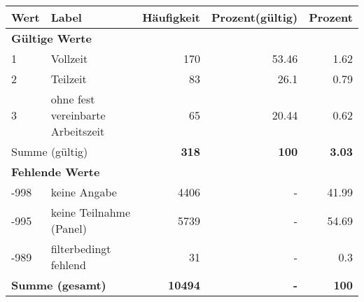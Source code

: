      \begin{longtable}{lXrrr}
     \toprule
     \textbf{Wert} & \textbf{Label} & \textbf{Häufigkeit} & \textbf{Prozent(gültig)} & \textbf{Prozent} \\
     \endhead
     \midrule
     \multicolumn{5}{l}{\textbf{Gültige Werte}}\\

     1 &
     \multicolumn{1}{X}{ Vollzeit   } &


       \num{170} &
       \num[round-mode=places,round-precision=2]{53.46} &
         \num[round-mode=places,round-precision=2]{1.62} \\

     2 &
     \multicolumn{1}{X}{ Teilzeit   } &


       \num{83} &
       \num[round-mode=places,round-precision=2]{26.1} &
         \num[round-mode=places,round-precision=2]{0.79} \\

     3 &
     \multicolumn{1}{X}{ ohne fest vereinbarte Arbeitszeit   } &


       \num{65} &
       \num[round-mode=places,round-precision=2]{20.44} &
         \num[round-mode=places,round-precision=2]{0.62} \\
     \midrule
     \multicolumn{2}{l}{Summe (gültig)} &
       \textbf{\num{318}} &
     \textbf{\num{100}} &
       \textbf{\num[round-mode=places,round-precision=2]{3.03}} \\
     \multicolumn{5}{l}{\textbf{Fehlende Werte}}\\
       -998 &
       keine Angabe &
         \num{4406} &
        - &
         \num[round-mode=places,round-precision=2]{41.99} \\
       -995 &
       keine Teilnahme (Panel) &
         \num{5739} &
        - &
         \num[round-mode=places,round-precision=2]{54.69} \\
       -989 &
       filterbedingt fehlend &
         \num{31} &
        - &
         \num[round-mode=places,round-precision=2]{0.3} \\
     \midrule
     \multicolumn{2}{l}{\textbf{Summe (gesamt)}} &
          \textbf{\num{10494}} &
        \textbf{-} &
        \textbf{\num{100}} \\
     \bottomrule
     \end{longtable}
     
